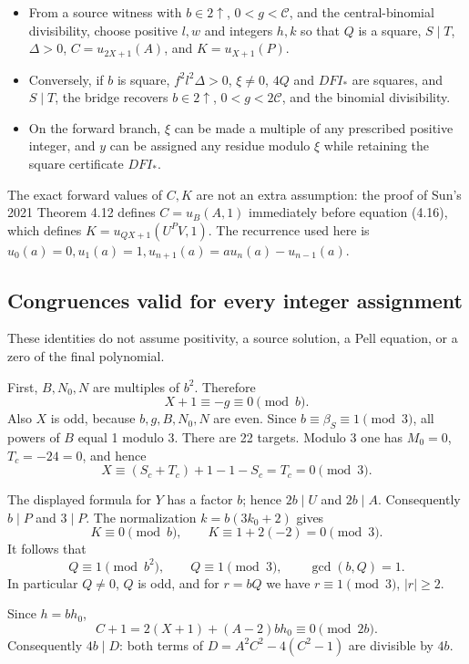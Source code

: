 \begin{itemize}
\item
  From a source witness with \(b\in2\uparrow\), \(0<g<\mathcal C\), and
  the central-binomial divisibility, choose positive \(l,w\) and
  integers \(h,k\) so that \(Q\) is a square, \(S\mid T\), \(\Delta>0\),
  \(C=u_{2X+1}(A)\), and \(K=u_{X+1}(P)\).
\item
  Conversely, if \(b\) is square, \(f^2l^2\Delta>0\), \(\xi\ne0\),
  \(4Q\) and \(DFI_*\) are squares, and \(S\mid T\), the bridge recovers
  \(b\in2\uparrow\), \(0<g<2\mathcal C\), and the binomial divisibility.
\item
  On the forward branch, \(\xi\) can be made a multiple of any
  prescribed positive integer, and \(y\) can be assigned any residue
  modulo \(\xi\) while retaining the square certificate \(DFI_*\).
\end{itemize}

The exact forward values of \(C,K\) are not an extra assumption: the
proof of Sun's 2021 Theorem 4.12 defines \(C=u_B(A,1)\) immediately
before equation (4.16), which defines \(K=u_{QX+1}(U^PV,1)\). The
recurrence used here is
\(u_0(a)=0,u_1(a)=1,u_{n+1}(a)=au_n(a)-u_{n-1}(a)\).

\subsection{Congruences valid for every integer
assignment}\label{congruences-valid-for-every-integer-assignment}

These identities do not assume positivity, a source solution, a Pell
equation, or a zero of the final polynomial.

First, \(B,N_0,N\) are multiples of \(b^2\). Therefore \[
 X+1\equiv-g\equiv0\pmod b.
\] Also \(X\) is odd, because \(b,g,B,N_0,N\) are even. Since
\(b\equiv\beta_S\equiv1\pmod3\), all powers of \(B\) equal 1 modulo 3.
There are 22 targets. Modulo 3 one has \(M_0=0\), \(T_c=-24=0\), and
hence \[
 X\equiv(S_c+T_c)+1-1-S_c=T_c=0\pmod3.
\]

The displayed formula for \(Y\) has a factor \(b\); hence \(2b\mid U\)
and \(2b\mid A\). Consequently \(b\mid P\) and \(3\mid P\). The
normalization \(k=b(3k_0+2)\) gives \[
 K\equiv0\pmod b,\qquad K\equiv1+2(-2)=0\pmod3.
\] It follows that \[
 Q\equiv1\pmod{b^2},\qquad Q\equiv1\pmod3,
 \qquad \gcd(b,Q)=1.
\] In particular \(Q\ne0\), \(Q\) is odd, and for \(r=bQ\) we have
\(r\equiv1\pmod3\), \(|r|\ge2\).

Since \(h=bh_0\), \[
 C+1=2(X+1)+(A-2)bh_0\equiv0\pmod{2b}.
\] Consequently \(4b\mid D\): both terms of \(D=A^2C^2-4(C^2-1)\) are
divisible by \(4b\).

